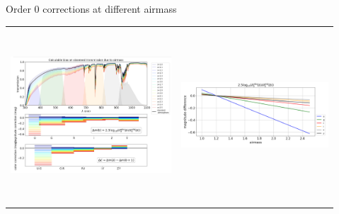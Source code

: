 \documentclass{beamer}
\begin{document}


\begin{frame}{Order 0 corrections at different airmass}

\begin{tabular}{cc}
\includegraphics[width=6cm,height=6.5cm,angle=0]{figs/PCCorr/fig1_PCCorrOrder0th_airmass.png} &
\includegraphics[width=5.5cm,height=4cm,angle=0]{figs/PCCorr/fig2_PCCorrOrder0th_airmass.png}
\end{tabular}
\end{frame}
\end{document}
